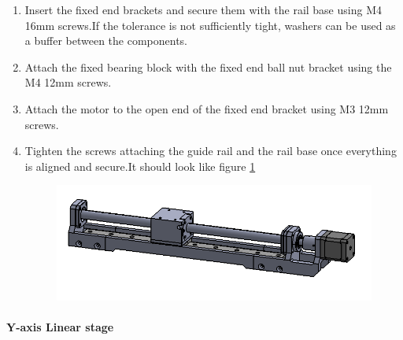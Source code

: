 \begin{enumerate}
\item Insert the fixed end brackets and secure them with the rail base using M4 16mm screws.If the tolerance is not sufficiently tight, washers can be used as a buffer between the components. 

\item Attach the fixed bearing block with the fixed end ball nut bracket using the M4 12mm screws. 

\item Attach the motor to the open end of the fixed end bracket using M3 12mm screws. 

\item Tighten the screws attaching the guide rail and the rail base once everything is aligned and secure.It should look like figure \ref{fig:xaxis6}

\begin{figure}
    \centering
    \includegraphics[scale=0.4]{Platforms/figs/xaxis6.png}
    \caption{\label{fig:xaxis6}}
\end{figure}

\end{enumerate}




\paragraph{Y-axis Linear stage}

